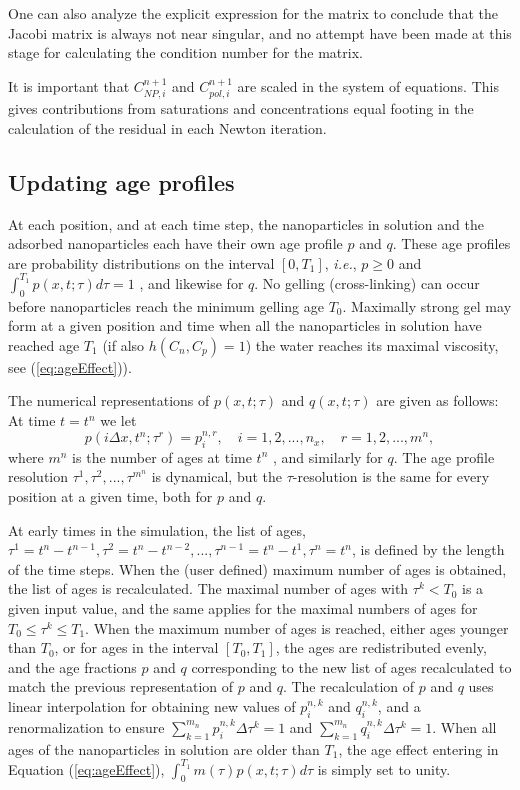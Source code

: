 One can also analyze the explicit expression for the matrix to conclude that the Jacobi matrix is always not near singular, and no attempt have been made at this stage for calculating the condition number for the matrix.

It is important that  $C^{n+1}_{\textit{NP}, i}$ and $C^{n+1}_{pol, i}$ are scaled in the system of equations. This gives contributions from saturations and concentrations equal footing in the calculation of the residual in each Newton iteration.

\subsection{Updating age profiles}
 At each position, and at each time step, the nanoparticles in solution and the adsorbed nanoparticles each have their own age profile $p$ and $q$. These age profiles are probability distributions on the interval $[0,T_1]$, \textit{i.e.}, $p\geq0$  and $\int^{T_1}_0 p(x,t;\tau)d\tau=1$  , and likewise for  $q$. No gelling (cross-linking) can occur before nanoparticles reach the minimum gelling age  $T_0$. Maximally strong gel may form at a given position and time when all the nanoparticles in solution have reached age $T_1$ (if also $h(C_n,C_p)=1$) the water reaches its maximal viscosity, see (\ref{eq:ageEffect})).

The numerical representations of $p(x,t;\tau)$ and $q(x,t;\tau)$ are given as follows: At time $t=t^n$ we let
\begin{equation}
    p(i\Delta x,t^n;\tau^r)=p^{n,r}_i, \quad i=1,2,...,n_x, \quad r=1,2,...,m^n,
\end{equation}
where $m^n$ is the number of ages at time $t^n$ , and similarly for $q$. The age profile resolution $\tau^1,\tau^2,...,\tau^{m^n}$ is dynamical, but the  $\tau$-resolution is the same for every position at a given time, both for $p$ and $q$.

At early times in the simulation, the list of ages, $\tau^1=t^n-t^{n-1},\tau^2=t^n-t^{n-2},...,\tau^{n-1}=t^n-t^1, \tau^{n}=t^n$, is defined by the length of the time steps. When the (user defined) maximum number of ages is obtained, the list of ages is recalculated. The maximal number of ages with $\tau^k<T_0$  is a given input value, and the same applies for the maximal numbers of ages for  $T_0\leq\tau^k\leq T_1$. When the maximum number of ages is reached, either ages younger than  $T_0$, or for ages in the interval $[T_0,T_1]$, the ages are redistributed evenly, and the age fractions $p$ and $q$ corresponding to the new list of ages recalculated to match the previous representation of $p$ and $q$. The recalculation of $p$ and $q$ uses linear interpolation for obtaining new values of  $p^{n,k}_i$ and $q^{n,k}_i$, and a renormalization to ensure $\sum^{m_n}_{k=1} p_i^{n,k}\Delta\tau^k=1$  and  $\sum^{m_n}_{k=1} q_i^{n,k}\Delta\tau^k=1$. When all ages of the nanoparticles in solution are older than $T_1$, the age effect entering in Equation (\ref{eq:ageEffect}), $\int^{T_1}_{0} m(\tau)p(x,t;\tau)d\tau$ is simply set to unity.

